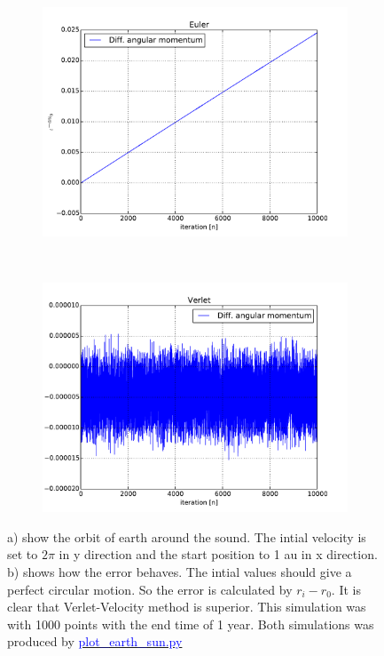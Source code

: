 \begin{figure}[H]
    \centering
    \begin{subfigure}{0.5\textwidth}
        \centering
        \includegraphics[width=\linewidth]{result/bilder/ang-momentum-euler.pdf}
    	\caption{}
    \end{subfigure}%
    ~ 
    \begin{subfigure}{0.5\textwidth}
        \centering
        \includegraphics[width=\linewidth]{result/bilder/ang-momentum-verlet.pdf}
        \caption{}
    \end{subfigure}
    \caption{a) show the orbit of earth around the sound. The intial velocity is set to $2\pi$ in y direction and the start position to 1 au in x direction. b) shows how the error behaves. The intial values should give a perfect circular motion. So the error is calculated by $r_i - r_{0}$. It is clear that Verlet-Velocity method is superior. This simulation was with 1000 points with the end time of 1 year. Both simulations was produced by \href{https://github.com/erikfsk/Project-3/blob/master/Project3/3a/plot_earth_sun.py}{\textcolor{blue}{plot\_earth\_sun.py}}}
    \label{fig:conserved-ang}
\end{figure}





